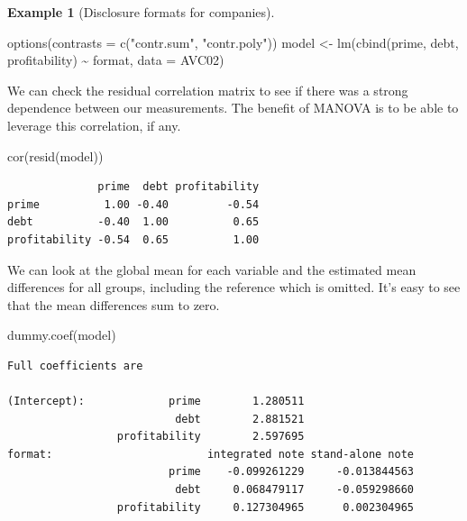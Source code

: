 \documentclass[
  11pt,
  letterpaper,
]{scrbook}
\newenvironment{Shaded}{\begin{snugshade}}{\end{snugshade}}
\newcommand{\AttributeTok}[1]{\textcolor[rgb]{0.40,0.45,0.13}{#1}}
\newcommand{\FunctionTok}[1]{\textcolor[rgb]{0.28,0.35,0.67}{#1}}
\newcommand{\NormalTok}[1]{\textcolor[rgb]{0.00,0.23,0.31}{#1}}
\newcommand{\OtherTok}[1]{\textcolor[rgb]{0.00,0.23,0.31}{#1}}
\newcommand{\SpecialCharTok}[1]{\textcolor[rgb]{0.37,0.37,0.37}{#1}}
\newcommand{\StringTok}[1]{\textcolor[rgb]{0.13,0.47,0.30}{#1}}
\theoremstyle{definition}
\theoremstyle{definition}
\newtheorem{example}{Example}[chapter]
\theoremstyle{remark}
\begin{document}
\begin{example}[Disclosure formats for
companies]
\begin{Shaded}
\begin{Highlighting}[]
\FunctionTok{options}\NormalTok{(}\AttributeTok{contrasts =} \FunctionTok{c}\NormalTok{(}\StringTok{"contr.sum"}\NormalTok{, }\StringTok{"contr.poly"}\NormalTok{))}
\NormalTok{model }\OtherTok{\textless{}{-}} \FunctionTok{lm}\NormalTok{(}\FunctionTok{cbind}\NormalTok{(prime, debt, profitability) }\SpecialCharTok{\textasciitilde{}}\NormalTok{ format, }
            \AttributeTok{data =}\NormalTok{ AVC02)}
\end{Highlighting}
\end{Shaded}

We can check the residual correlation matrix to see if there was a
strong dependence between our measurements. The benefit of MANOVA is to
be able to leverage this correlation, if any.

\begin{Shaded}
\begin{Highlighting}[]
\FunctionTok{cor}\NormalTok{(}\FunctionTok{resid}\NormalTok{(model))}
\end{Highlighting}
\end{Shaded}

\begin{verbatim}
              prime  debt profitability
prime          1.00 -0.40         -0.54
debt          -0.40  1.00          0.65
profitability -0.54  0.65          1.00
\end{verbatim}

We can look at the global mean for each variable and the estimated mean
differences for all groups, including the reference which is omitted.
It's easy to see that the mean differences sum to zero.

\begin{Shaded}
\begin{Highlighting}[]
\FunctionTok{dummy.coef}\NormalTok{(model)}
\end{Highlighting}
\end{Shaded}

\begin{verbatim}
Full coefficients are 
                                                               
(Intercept):             prime        1.280511                 
                          debt        2.881521                 
                 profitability        2.597695                 
format:                        integrated note stand-alone note
                         prime    -0.099261229     -0.013844563
                          debt     0.068479117     -0.059298660
                 profitability     0.127304965      0.002304965
                                       

\end{verbatim}
\end{example}
\end{document}
